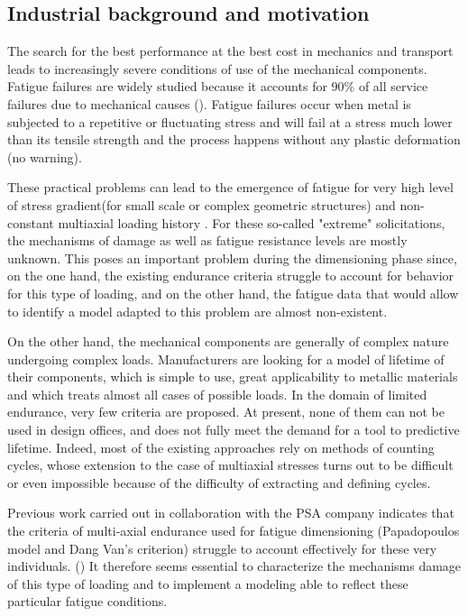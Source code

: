 \subsection{Industrial background and motivation}
The search for the best performance at the best cost in mechanics and
transport leads to increasingly
severe conditions of use of the mechanical components. Fatigue failures are widely studied
because it accounts for 90\% of all service
failures due to mechanical causes (\cite{sohar2011lifetime}).  Fatigue failures occur when metal is
subjected to a repetitive or fluctuating
stress and will fail at a stress much lower
than its tensile strength and the process happens without any plastic
deformation (no warning).

These practical problems can lead to the emergence of fatigue for
very high level of stress gradient(for small scale or complex geometric structures) and non-constant multiaxial loading history
. For these so-called "extreme" solicitations, the mechanisms of damage
as well as fatigue resistance levels are mostly unknown.
This poses an important problem during the dimensioning phase since, on the one hand, the
existing endurance criteria struggle to account for behavior for this type of
loading, and on the other hand, the fatigue data that would allow to identify a model
adapted to this problem are almost non-existent.

On the other hand, the mechanical components are generally of complex nature undergoing
complex loads. Manufacturers are looking for a model of lifetime
of their components, which is simple to use, great applicability to metallic materials
and which treats almost all cases of possible loads. In the domain of
limited endurance, very few criteria are proposed. At present, none of them
can not be used in design offices, and does not fully meet the demand for a tool to
predictive lifetime. Indeed, most of the existing approaches rely on
methods of counting cycles, whose extension to the case of multiaxial stresses turns out to be
difficult or even impossible because of the difficulty of extracting and defining cycles.

Previous work carried out in collaboration with the PSA company indicates that the criteria
of multi-axial endurance used for fatigue dimensioning (Papadopoulos model
and Dang Van's criterion) struggle to account effectively for these very
individuals. (\cite{koutiri2011effet}) It therefore seems essential to characterize the mechanisms
damage of this type of loading and to implement a modeling
able to reflect these particular fatigue conditions.

